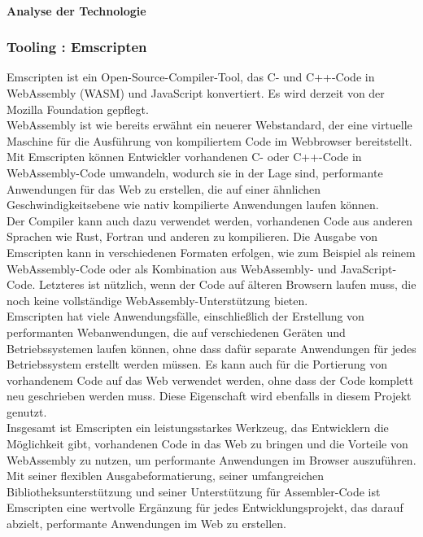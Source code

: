 \paragraph*{Analyse der Technologie}

\subsubsection{Tooling : Emscripten}
Emscripten ist ein Open-Source-Compiler-Tool, das C- und C++-Code in WebAssembly (WASM) und JavaScript konvertiert. Es wird derzeit von der Mozilla Foundation gepflegt. \\
WebAssembly ist wie bereits erwähnt ein neuerer Webstandard, der eine virtuelle Maschine für die Ausführung von kompiliertem Code im Webbrowser bereitstellt. Mit Emscripten können Entwickler vorhandenen C- oder C++-Code in WebAssembly-Code umwandeln, wodurch sie in der Lage sind, performante Anwendungen für das Web zu erstellen, die auf einer ähnlichen Geschwindigkeitsebene wie nativ kompilierte Anwendungen laufen können. \\
Der Compiler kann auch dazu verwendet werden, vorhandenen Code aus anderen Sprachen wie Rust, Fortran und anderen zu kompilieren. Die Ausgabe von Emscripten kann in verschiedenen Formaten erfolgen, wie zum Beispiel als reinem WebAssembly-Code oder als Kombination aus WebAssembly- und JavaScript-Code. Letzteres ist nützlich, wenn der Code auf älteren Browsern laufen muss, die noch keine vollständige WebAssembly-Unterstützung bieten. \\
Emscripten hat viele Anwendungsfälle, einschließlich der Erstellung von performanten Webanwendungen, die auf verschiedenen Geräten und Betriebssystemen laufen können, ohne dass dafür separate Anwendungen für jedes Betriebssystem erstellt werden müssen. Es kann auch für die Portierung von vorhandenem Code auf das Web verwendet werden, ohne dass der Code komplett neu geschrieben werden muss. Diese Eigenschaft wird ebenfalls in diesem Projekt genutzt. \\
Insgesamt ist Emscripten ein leistungsstarkes Werkzeug, das Entwicklern die Möglichkeit gibt, vorhandenen Code in das Web zu bringen und die Vorteile von WebAssembly zu nutzen, um performante Anwendungen im Browser auszuführen. Mit seiner flexiblen Ausgabeformatierung, seiner umfangreichen Bibliotheksunterstützung und seiner Unterstützung für Assembler-Code ist Emscripten eine wertvolle Ergänzung für jedes Entwicklungsprojekt, das darauf abzielt, performante Anwendungen im Web zu erstellen. \\
\cite*{emscriptenwebsite}
